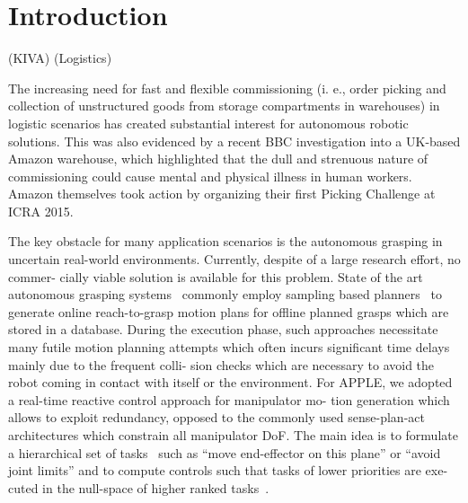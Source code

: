 \section{Introduction}
\label{sec:intro}
%
\cite{Wurm08}(KIVA) \cite{Eche08}(Logistics)

The increasing need for fast and flexible commissioning (i. e., order picking and collection of
unstructured goods from storage compartments in warehouses) in logistic scenarios has created
substantial interest for autonomous robotic solutions. This was also evidenced by a recent BBC
investigation into a UK-based Amazon warehouse, which highlighted that the dull and strenuous nature
of commissioning could cause mental and physical illness in human workers. Amazon themselves took
action by organizing their first Picking Challenge at ICRA 2015.

The key obstacle for many application scenarios is the autonomous grasping in uncertain real-world
environments. Currently, despite of a large research effort, no commer- cially viable solution is
available for this problem. State of the art autonomous grasping systems~\cite{Bere07, Srin10,
  Krug14a} commonly employ sampling based planners~\cite{LaVa06} to generate online reach-to-grasp
motion plans for offline planned grasps which are stored in a database.  During the execution phase,
such approaches necessitate many futile motion planning attempts which often incurs significant time
delays mainly due to the frequent colli- sion checks which are necessary to avoid the robot coming
in contact with itself or the environment.  For APPLE, we adopted a real-time reactive control
approach for manipulator mo- tion generation which allows to exploit redundancy, opposed to the
commonly used sense-plan-act architectures which constrain all manipulator DoF. The main idea is to
formulate a hierarchical set of tasks~\cite{Sams91} such as “move end-effector on this plane” or
“avoid joint limits” and to compute controls such that tasks of lower priorities are exe- cuted in
the null-space of higher ranked tasks~\cite{Sici91, Sent10}.

